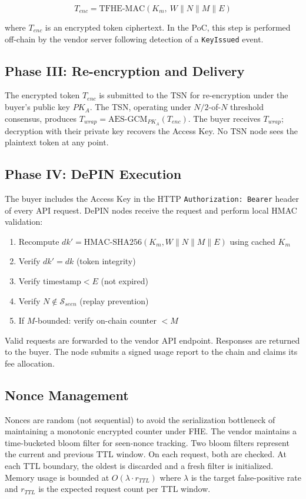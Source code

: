 \documentclass[conference]{IEEEtran}
\begin{document}
\begin{equation}
T_{enc} = \mathrm{TFHE\text{-}MAC}(K_m,\ W \| N \| M \| E)
\label{eq:token}
\end{equation}

where $T_{enc}$ is an encrypted token ciphertext. In the PoC, this step is performed
off-chain by the vendor server following detection of a \texttt{KeyIssued} event.

\subsection{Phase III: Re-encryption and Delivery}
The encrypted token $T_{enc}$ is submitted to the TSN for re-encryption under the
buyer's public key $PK_A$. The TSN, operating under $N/2$-of-$N$ threshold consensus,
produces $T_{wrap} = \mathrm{AES\text{-}GCM}_{PK_A}(T_{enc})$. The buyer receives
$T_{wrap}$; decryption with their private key recovers the Access Key. No TSN node
sees the plaintext token at any point.

\subsection{Phase IV: DePIN Execution}
The buyer includes the Access Key in the HTTP \texttt{Authorization: Bearer} header
of every API request. DePIN nodes receive the request and perform local HMAC validation:

\begin{enumerate}
\item Recompute $dk' = \mathrm{HMAC\text{-}SHA256}(K_m, W \| N \| M \| E)$ using
      cached $K_m$
\item Verify $dk' = dk$ (token integrity)
\item Verify $\mathrm{timestamp} < E$ (not expired)
\item Verify $N \notin \mathcal{S}_{seen}$ (replay prevention)
\item If $M$-bounded: verify on-chain counter $< M$
\end{enumerate}

Valid requests are forwarded to the vendor API endpoint. Responses are returned to the
buyer. The node submits a signed usage report to the chain and claims its fee allocation.

\subsection{Nonce Management}
Nonces are random (not sequential) to avoid the serialization bottleneck of maintaining
a monotonic encrypted counter under FHE. The vendor maintains a time-bucketed bloom
filter for seen-nonce tracking. Two bloom filters represent the current and previous TTL
window. On each request, both are checked. At each TTL boundary, the oldest is discarded
and a fresh filter is initialized. Memory usage is bounded at $O(\lambda \cdot r_{TTL})$
where $\lambda$ is the target false-positive rate and $r_{TTL}$ is the expected request
count per TTL window.
\end{document}
